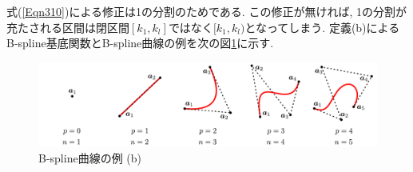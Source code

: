 \documentclass{jsarticle}
\theoremstyle{definition}%
\begin{document}
式(\ref{Eqn310})による修正は1の分割のためである.
この修正が無ければ, 1の分割が充たされる区間は閉区間$[k_1,k_l]$ではなく$[k_1,k_l)$となってしまう.
定義(b)によるB-spline基底関数とB-spline曲線の例を次の図\ref{Fig300b}に示す.
\addtocounter{footnote}{-1}
\begin{figure}[htbp]
	\centering
    \includegraphics[page=16,clip,width=160mm]{fig.pdf}
    \caption{B-spline曲線の例 (b)\protect\footnotemark}
	\label{Fig300b}
\end{figure}
\end{document}
